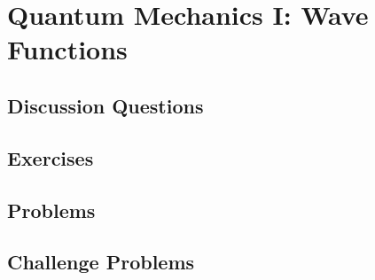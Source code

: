 
\chapter{Quantum Mechanics I: Wave Functions}

\section{Discussion Questions}

\section{Exercises}

\section{Problems}

\section{Challenge Problems}
